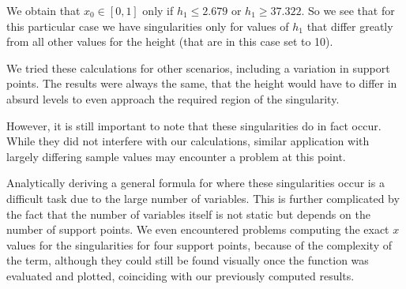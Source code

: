 \documentclass{article}
\begin{document}
We obtain that $x_0 \in \left[ 0,1 \right]$ only if $h_1 \leq 2.679$ or $h_1 \geq 37.322$. So we see that for this particular case we have singularities only for values of $h_1$ that differ greatly from all other values for the height (that are in this case set to 10).

We tried these calculations for other scenarios, including a variation in support points. The results were always the same, that the height would have to differ in absurd levels to even approach the required region of the singularity.

However, it is still important to note that these singularities do in fact occur. While they did not interfere with our calculations, similar application with largely differing sample values may encounter a problem at this point.

Analytically deriving a general formula for where these singularities occur is a difficult task due to the large number of variables. This is further complicated by the fact that the number of variables itself is not static but depends on the number of support points. We even encountered problems computing the exact $x$ values for the singularities for four support points, because of the complexity of the term, although they could still be found visually once the function was evaluated and plotted, coinciding with our previously computed results.

\newcommand{\fracsumme}{\mathtt{approx\_int}}



\end{document}
